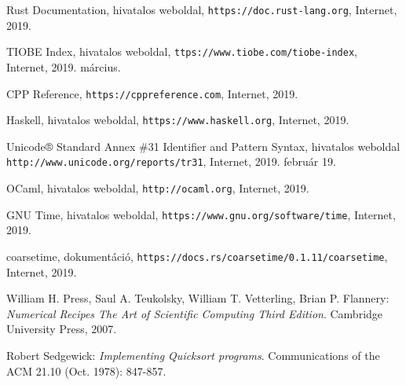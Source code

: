 
\begin{thebibliography}{x}

Rust Documentation, hivatalos weboldal, \texttt{https://doc.rust-lang.org}, Internet, 2019.

TIOBE Index, hivatalos weboldal, \texttt{ttps://www.tiobe.com/tiobe-index}, Internet, 2019. március.

CPP Reference, \texttt{https://cppreference.com}, Internet, 2019.

Haskell, hivatalos weboldal, \texttt{https://www.haskell.org}, Internet, 2019.

Unicode® Standard Annex \#31 Identifier and Pattern Syntax, hivatalos weboldal \texttt{http://www.unicode.org/reports/tr31}, Internet, 2019. február 19.

OCaml, hivatalos weboldal, \texttt{http://ocaml.org}, Internet, 2019.

GNU Time, hivatalos weboldal, \texttt{https://www.gnu.org/software/time}, Internet, 2019.

coarsetime, dokumentáció, \texttt{https://docs.rs/coarsetime/0.1.11/coarsetime}, Internet, 2019.

William H. Press, Saul A. Teukolsky, William T. Vetterling, Brian P. Flannery: \emph{Numerical Recipes The Art of Scientific Computing Third Edition}. Cambridge University Press, 2007.

Robert Sedgewick: \emph{Implementing Quicksort programs}. Communications of the ACM 21.10 (Oct. 1978): 847-857.

\end{thebibliography}
